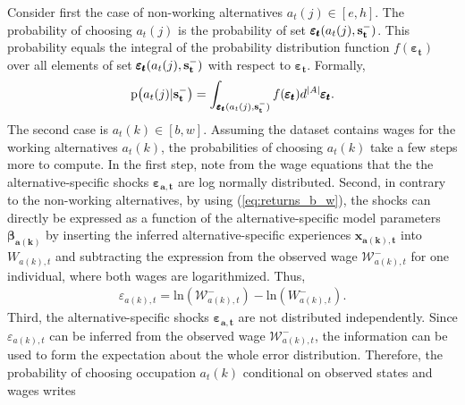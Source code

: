 Consider first the case of non-working alternatives $a_t(j) \in [e,h]$. The probability of choosing $a_t(j)$ is the probability of set $\pmb{\varepsilon_t}(a_t(j),\bold{s_t^-})$. This probability equals the integral of the probability distribution function $f(\pmb{\varepsilon_t})$ over all elements of set $\pmb{\varepsilon_t}(a_t(j),\bold{s_t^-})$ with respect to $\pmb{\varepsilon_t}$. Formally,
\begin{align}
\text{p}\big(a_t(j) | \bold{s_t^-}\big) = \int_{\pmb{\varepsilon_t}(a_t(j),\bold{s_t^-})} f(\pmb{\varepsilon_t}) d^{|A|} \pmb{\varepsilon_t}.
\end{align}
\noindent
The second case is $a_t(k) \in [b,w]$. Assuming the dataset contains wages for the working alternatives $a_t(k)$, the probabilities of choosing $a_t(k)$ take a few steps more to compute. In the first step, note from the wage equations that the the alternative-specific shocks $\pmb{\varepsilon_{a,t}}$ are log normally distributed. Second, in contrary to the non-working alternatives, by using (\ref{eq:returns_b_w}), the shocks can directly be expressed as a function of the alternative-specific model parameters $\pmb{\beta_{a(k)}}$ by inserting the inferred alternative-specific experiences $\pmb{x_{a(k),t}}$ into $W_{a(k),t}$ and subtracting the expression from the observed wage $\mathcal{W}^{-}_{a(k),t}$ for one individual, where both wages are logarithmized. Thus,
\begin{align} \label{eq:epsilon}
\varepsilon_{a(k),t} = \text{ln}(\mathcal{W}^{-}_{a(k),t}) - \text{ln}(W_{a(k),t}^{-}).
\end{align}
Third, the alternative-specific shocks $\pmb{\varepsilon_{a,t}}$ are not distributed independently. Since $\varepsilon_{a(k),t}$ can be inferred from the
observed wage $\mathcal{W}^{-}_{a(k),t}$, the information can be used to form the expectation about the whole error distribution. Therefore, the probability of choosing occupation $a_t(k)$ conditional on observed states and wages writes

